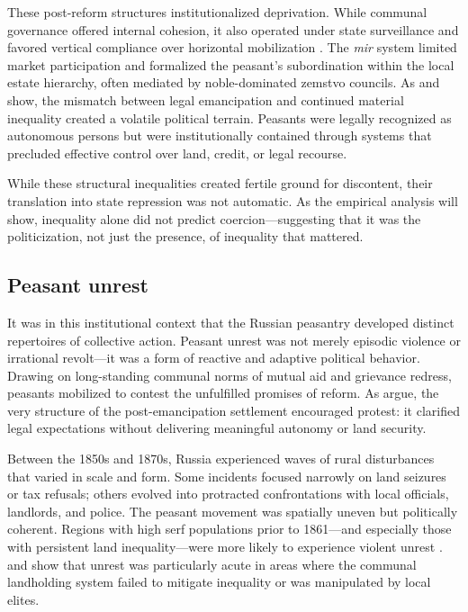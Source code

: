 \documentclass[11pt]{scrarticle}
\begin{document}
These post-reform structures institutionalized deprivation. While communal governance offered internal cohesion, it also operated under state surveillance and favored vertical compliance over horizontal mobilization \parencite{dennison_living_2012}. The \textit{mir} system limited market participation and formalized the peasant’s subordination within the local estate hierarchy, often mediated by noble-dominated zemstvo councils. As \cite{popov_factors_2023} and \cite{finkel_does_2015} show, the mismatch between legal emancipation and continued material inequality created a volatile political terrain. Peasants were legally recognized as autonomous persons but were institutionally contained through systems that precluded effective control over land, credit, or legal recourse.

While these structural inequalities created fertile ground for discontent, their translation into state repression was not automatic. As the empirical analysis will show, inequality alone did not predict coercion—suggesting that it was the politicization, not just the presence, of inequality that mattered.

\subsection{Peasant unrest}

It was in this institutional context that the Russian peasantry developed distinct repertoires of collective action. Peasant unrest was not merely episodic violence or irrational revolt—it was a form of reactive and adaptive political behavior. Drawing on long-standing communal norms of mutual aid and grievance redress, peasants mobilized to contest the unfulfilled promises of reform. As \cite{finkel_does_2015} argue, the very structure of the post-emancipation settlement encouraged protest: it clarified legal expectations without delivering meaningful autonomy or land security.

Between the 1850s and 1870s, Russia experienced waves of rural disturbances that varied in scale and form. Some incidents focused narrowly on land seizures or tax refusals; others evolved into protracted confrontations with local officials, landlords, and police. The peasant movement was spatially uneven but politically coherent. Regions with high serf populations prior to 1861—and especially those with persistent land inequality—were more likely to experience violent unrest \cite{kofanov_land_2020}. \cite{dower_collective_2017} and \cite{popov_factors_2023} show that unrest was particularly acute in areas where the communal landholding system failed to mitigate inequality or was manipulated by local elites.
\end{document}
